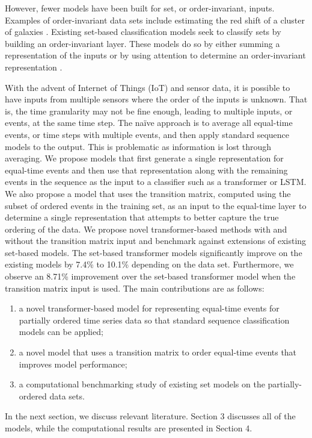 \documentclass[reqno ,11pt]{article}
\begin{document}
However, fewer models have been built for set, or order-invariant, inputs. Examples of order-invariant data sets include estimating the red shift of a cluster of galaxies \cite{deep-sets}. Existing set-based classification models seek to classify sets by building an order-invariant layer. These models do so by either summing a representation of the inputs or by using attention to determine an order-invariant representation \cite{order-matters, deep-sets}. 

With the advent of Internet of Things (IoT) and sensor data, it is possible to have inputs from multiple sensors where the order of the inputs is unknown. That is, the time granularity may not be fine enough, leading to multiple inputs, or events, at the same time step. The na\"{i}ve approach is to average all equal-time events, or time steps with multiple events, and then apply standard sequence models to the output. This is problematic as information is lost through averaging. We propose models that first generate a single representation for equal-time events and then use that representation along with the remaining events in the sequence as the input to a classifier such as a transformer or LSTM. We also propose a model that uses the transition matrix, computed using the subset of ordered events in the training set, as an input to the equal-time layer to determine a single representation that attempts to better capture the true ordering of the data. We propose novel transformer-based methods with and without the transition matrix input and benchmark against extensions of existing set-based models. The set-based transformer models significantly improve on the existing models by 7.4\% to 10.1\% depending on the data set. Furthermore, we observe an 8.71\% improvement over the set-based transformer model when the transition matrix input is used. The main contributions are as follows:

\begin{enumerate}
\item a novel transformer-based model for representing equal-time events for partially ordered time series data so that standard sequence classification models can be applied; 
\item a novel model that uses a transition matrix to order equal-time events that improves model performance;
\item a computational benchmarking study of existing set models on the partially-ordered data sets. 
\end{enumerate}
In the next section, we discuss relevant literature. Section 3 discusses all of the models, while the computational results are presented in Section 4. 
\end{document}
